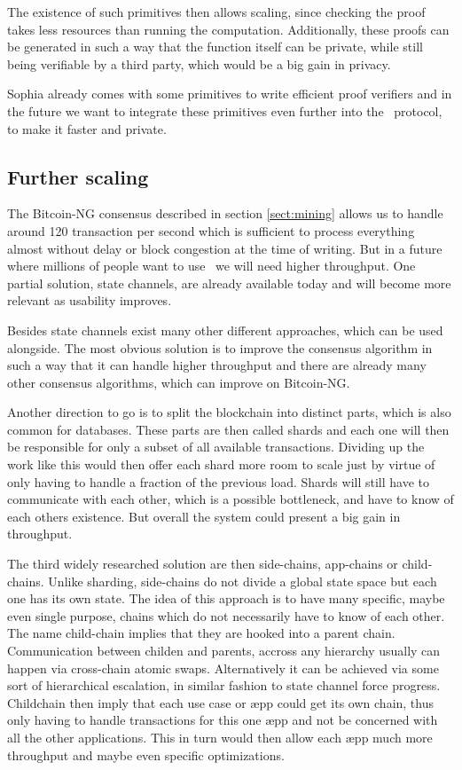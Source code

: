 The existence of such primitives then allows scaling, since checking the
proof takes less resources than running the computation. Additionally, these
proofs can be generated in such a way that the function itself can be private,
while still being verifiable by a third party, which would be a big gain in
privacy.

Sophia already comes with some primitives to write efficient proof verifiers
and in the future we want to integrate these primitives even further into the
\aet\ protocol, to make it faster and private.

\subsection{Further scaling}

The Bitcoin-NG consensus described in section \ref{sect:mining} allows us to
handle around 120 transaction per second which is sufficient to process
everything almost without delay or block congestion at the time of writing.
But in a future where millions of people want to use \aet\ we will need higher
throughput. One partial solution, state channels, are already available today
and will become more relevant as usability improves.

Besides state channels exist many other different approaches, which can be used
alongside. The most obvious solution is to improve the consensus algorithm in
such a way that it can handle higher throughput and there are already many
other consensus algorithms, which can improve on Bitcoin-NG.

Another direction to go is to split the blockchain into distinct parts, which
is also common for databases. These parts are then called shards and each one
will then be responsible for only a subset of all available transactions.
Dividing up the work like this would then offer each shard more room to scale
just by virtue of only having to handle a fraction of the previous load. Shards
will still have to communicate with each other, which is a possible bottleneck,
and have to know of each others existence. But overall the system could present
a big gain in throughput.

The third widely researched solution are then side-chains, app-chains or
child-chains.
Unlike sharding, side-chains do not divide a global state space but each
one has its own state. The idea of this approach is to have many specific,
maybe even single purpose, chains which do not necessarily have to know of each
other. The name child-chain implies that they are
hooked into a parent chain. Communication between childen and parents, accross any hierarchy usually can happen via cross-chain atomic swaps. Alternatively it can be achieved via some sort of hierarchical escalation, in similar fashion to state channel force progress. 
Childchain then imply that each use case or æpp could get its own chain,
thus only having to handle transactions for this one æpp and not be concerned
with all the other applications. This in turn would then allow each æpp much
more throughput and maybe even specific optimizations.

